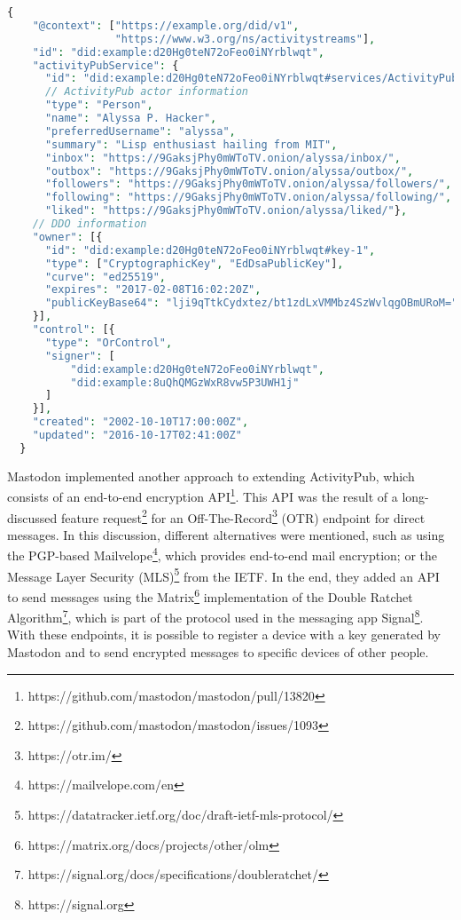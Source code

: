 \lstset{style=JSONStyle}
\begin{lstlisting}[language=PHP, caption=DID document with inserted ActivityPub actor. Adapted from \cite{webber_sporny_2017}, label=lst:did_and_ap, float=h]
  {
    "@context": ["https://example.org/did/v1",
                 "https://www.w3.org/ns/activitystreams"],
    "id": "did:example:d20Hg0teN72oFeo0iNYrblwqt",
    "activityPubService": {
      "id": "did:example:d20Hg0teN72oFeo0iNYrblwqt#services/ActivityPub",
      // ActivityPub actor information
      "type": "Person",
      "name": "Alyssa P. Hacker",
      "preferredUsername": "alyssa",
      "summary": "Lisp enthusiast hailing from MIT",
      "inbox": "https://9GaksjPhy0mWToTV.onion/alyssa/inbox/",
      "outbox": "https://9GaksjPhy0mWToTV.onion/alyssa/outbox/",
      "followers": "https://9GaksjPhy0mWToTV.onion/alyssa/followers/",
      "following": "https://9GaksjPhy0mWToTV.onion/alyssa/following/",
      "liked": "https://9GaksjPhy0mWToTV.onion/alyssa/liked/"},
    // DDO information
    "owner": [{
      "id": "did:example:d20Hg0teN72oFeo0iNYrblwqt#key-1",
      "type": ["CryptographicKey", "EdDsaPublicKey"],
      "curve": "ed25519",
      "expires": "2017-02-08T16:02:20Z",
      "publicKeyBase64": "lji9qTtkCydxtez/bt1zdLxVMMbz4SzWvlqgOBmURoM="
    }],
    "control": [{
      "type": "OrControl",
      "signer": [
          "did:example:d20Hg0teN72oFeo0iNYrblwqt",
          "did:example:8uQhQMGzWxR8vw5P3UWH1j"
      ]
    }],
    "created": "2002-10-10T17:00:00Z",
    "updated": "2016-10-17T02:41:00Z"
  }
\end{lstlisting}


Mastodon implemented another approach to extending ActivityPub, which consists of an end-to-end encryption API\footnote{https://github.com/mastodon/mastodon/pull/13820}. This API was the result of a long-discussed feature request\footnote{https://github.com/mastodon/mastodon/issues/1093} for an Off-The-Record\footnote{https://otr.im/}  (OTR) endpoint for direct messages. In this discussion, different alternatives were mentioned, such as using the PGP-based Mailvelope\footnote{https://mailvelope.com/en}, which provides end-to-end mail encryption; or the Message Layer Security (MLS)\footnote{https://datatracker.ietf.org/doc/draft-ietf-mls-protocol/} from the IETF. In the end, they added an API to send messages using the Matrix\footnote{https://matrix.org/docs/projects/other/olm} implementation of the Double Ratchet Algorithm\footnote{https://signal.org/docs/specifications/doubleratchet/}, which is part of the protocol used in the messaging app Signal\footnote{https://signal.org}. With these endpoints, it is possible to register a device with a key generated by Mastodon and to send encrypted messages to specific devices of other people.

